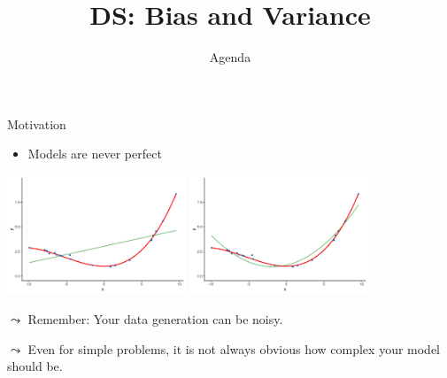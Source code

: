 \documentclass[aspectratio=169]{../latex_main/tntbeamer}  %
\title[Statistics]{DS: Bias and Variance}
\subtitle{Agenda}
\begin{document}
	
	\maketitle
	
    \begin{frame}{Motivation}

    \begin{itemize}
        \item Models are never perfect
    \end{itemize}

    \begin{center}
        \includegraphics[width=0.4\textwidth]{08_bias_and_variance/figure/Bild9.png}
        \includegraphics[width=0.4\textwidth]{08_bias_and_variance/figure/Bild10.png}    
    \end{center}
    
    $\leadsto$ Remember: Your data generation can be noisy.
    
    $\leadsto$ Even for simple problems, it is not always obvious how complex your model should be.

	\end{frame}
	
\end{document}
